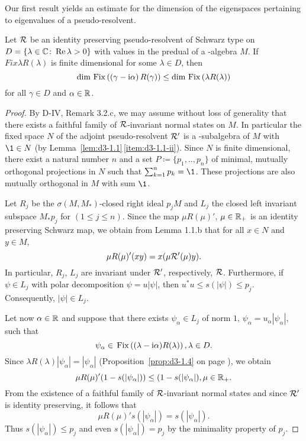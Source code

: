 Our first result yields an estimate for the dimension of the eigenspaces pertaining to eigenvalues of a pseudo-resolvent.
\begin{proposition}\label{prop:d3-2.1}
Let $\mathcal{R}$ be an identity preserving pseudo-resolvent of Schwarz type on $D = \{\lambda \in \mathbb{C} \colon \mathop{}\!\mathrm{Re}\,\lambda > 0\}$ with values in the predual of a \WA-algebra $M$. 
If $Fix{\lambda R(\lambda)}$ is finite dimensional for some $\lambda \in D$, then
\[
\dim \mathop{}\mathrm{Fix}\left(\left( \gamma - \mathrm{i}\alpha \right)R(\gamma)\right) \leq \dim \mathop{}\mathrm{Fix}\left(\lambda R(\lambda)\right)
\]
for all $\gamma \in D$ and $\alpha \in \mathbb{R}$.
\end{proposition}
\begin{proof}
By D-IV, Remark 3.2.c, we may assume without loss of generality that there exists a faithful family of $\mathcal{R}$-invariant normal states on $M$.
In particular the fixed space $N$ of the adjoint pseudo-resolvent $\mathcal{R}'$ is a \WA-subalgebra of $M$ with $\1 \in N$ (by Lemma~\ref{lem:d3-1.1}\,\ref{item:d3-1.1-ii}).
Since $N$ is finite dimensional, there exist a natural number $n$ and a set $P \coloneqq \{p_{1}, .., p_{n}\}$ of minimal, mutually orthogonal projections in $N$ such that $\sum_{k=1}^{n} p_{k} = \1$.
These projections are also mutually orthogonal in $M$ with sum $\1$.

Let $R_{j}$ be the $\sigma(M,M_{*})$-closed right ideal $p_{j}M$ and $L_{j}$ the closed left invariant subspace $M_{*}p_{j}$ for $(1 \leq j \leq n)$.
Since the map $\mu R(\mu)'$, $\mu \in \mathbb{R}_{+}$ is an identity preserving Schwarz map, we obtain from Lemma 1.1.b that for all $x \in N$ and $y \in M$,
\[
	\mu R(\mu)'(xy) = x(\mu \mathcal{R}'(\mu)y) .
\]
In particular, $R_{j}$, \resp $L_{j}$ are invariant under $\mathcal{R}'$, respectively, $\mathcal{R}$.
Furthermore, if $\psi \in L_{j}$ with polar decomposition $\psi = u|\psi|$, then $u^{*}u \leq s(|\psi|) \leq p_{j}$.
Consequently, $|\psi| \in L_{j}$.

Let now $\alpha \in \mathbb{R}$ and suppose that there exists $\psi_{\alpha} \in L_{j}$ of norm $ 1 $, $\psi_{\alpha} = u_{\alpha}|\psi_{\alpha}|$, such that
\[
	\psi_{\alpha} \in \mathop{}\mathrm{Fix}\left((\lambda - \mathrm{i}\alpha)R(\lambda)\right) , \lambda \in D .
\]
Since $\lambda R(\lambda)|\psi_{\alpha}| = |\psi_{\alpha}|$ (Proposition~\ref{prop:d3-1.4} on page \pageref{prop:d3-1.4}), we obtain
\[
	\mu R(\mu)'(1-s(|\psi_{\alpha}|)) \leq (1-s(|\psi_{\alpha}|) , \mu \in \mathbb{R}_{+} .
\]
From the existence of a faithful family of $\mathcal{R}$-invariant normal states and since $\mathcal{R}'$ is identity preserving, it follows that
\[
	\mu R(\mu)'s(|\psi_{\alpha}|) = s(|\psi_{\alpha}|) .
\]
Thus $s(|\psi_{\alpha}|) \leq p_{j}$ and even $s(|\psi_{\alpha}|) = p_{j}$ by the minimality property of $p_{j}$.


\end{proof}
